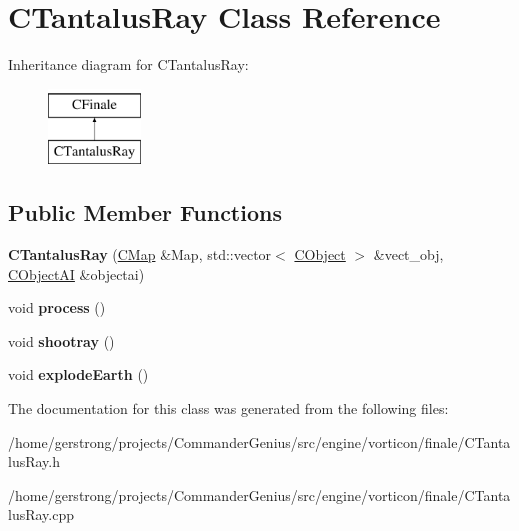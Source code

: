\hypertarget{class_c_tantalus_ray}{
\section{CTantalusRay Class Reference}
\label{class_c_tantalus_ray}
}
Inheritance diagram for CTantalusRay:\begin{figure}[H]
\begin{center}
\leavevmode
\includegraphics[height=2cm]{class_c_tantalus_ray}
\end{center}
\end{figure}
\subsection*{Public Member Functions}
\begin{DoxyCompactItemize}
\item 
\hypertarget{class_c_tantalus_ray_aa5de3052fe0acffe0ff9c2fff21fea8e}{
{\bfseries CTantalusRay} (\hyperlink{class_c_map}{CMap} \&Map, std::vector$<$ \hyperlink{class_c_object}{CObject} $>$ \&vect\_\-obj, \hyperlink{class_c_object_a_i}{CObjectAI} \&objectai)}
\label{class_c_tantalus_ray_aa5de3052fe0acffe0ff9c2fff21fea8e}

\item 
\hypertarget{class_c_tantalus_ray_a46255003757959dbcc8214d8c3785aef}{
void {\bfseries process} ()}
\label{class_c_tantalus_ray_a46255003757959dbcc8214d8c3785aef}

\item 
\hypertarget{class_c_tantalus_ray_a4d33755d41be6768fd89f8990f3360e1}{
void {\bfseries shootray} ()}
\label{class_c_tantalus_ray_a4d33755d41be6768fd89f8990f3360e1}

\item 
\hypertarget{class_c_tantalus_ray_af52877bbc8aa587848b7d3a7303f6809}{
void {\bfseries explodeEarth} ()}
\label{class_c_tantalus_ray_af52877bbc8aa587848b7d3a7303f6809}

\end{DoxyCompactItemize}


The documentation for this class was generated from the following files:\begin{DoxyCompactItemize}
\item 
/home/gerstrong/projects/CommanderGenius/src/engine/vorticon/finale/CTantalusRay.h\item 
/home/gerstrong/projects/CommanderGenius/src/engine/vorticon/finale/CTantalusRay.cpp\end{DoxyCompactItemize}
